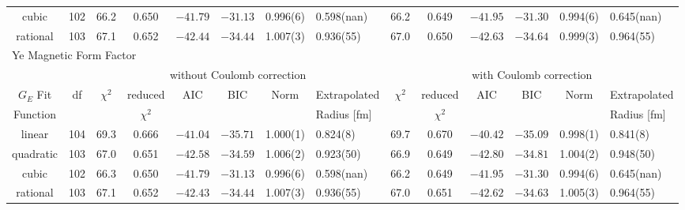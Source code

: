 \documentclass[10pt,superscriptaddress,aps,prc,twocolumn]{revtex4-1}
\begin{document}
\begin{table}
\begin{tabular}{cc|cccccl|cccccl}
cubic     & 102 &  66.2    & 0.650     &$-41.79$&$-31.13$& 0.996(6)  & 0.598(nan)&  66.2    & 0.649     &$-41.95$&$-31.30$& 0.994(6)  & 0.645(nan)    \\ 
rational  & 103 &  67.1    & 0.652     &$-42.44$&$-34.44$& 1.007(3)  & 0.936(55) &  67.0    & 0.650     &$-42.63$&$-34.64$& 0.999(3)  & 0.964(55)    \\ \hline \hline
\multicolumn{14}{l}{Ye Magnetic Form Factor}                                      \\ \hline
          &     & \multicolumn{6}{c}{without Coulomb correction}                 & \multicolumn{6}{|c}{with Coulomb correction} \\
$G_E$ Fit & df  & $\chi^2$ & reduced   & AIC    & BIC    & Norm      & Extrapolated & $\chi^2$ & reduced   & AIC    & BIC    & Norm      & Extrapolated      \\  
Function  &     &          &$\chi^2$   &        &        &           & Radius [fm]      &          & $\chi^2$  &        &        &       & Radius [fm]     \\ \hline
linear    & 104 &  69.3    & 0.666     &$-41.04$&$-35.71$& 1.000(1)  & 0.824(8)  &  69.7    & 0.670     &$-40.42$&$-35.09$& 0.998(1)  & 0.841(8)    \\
quadratic & 103 &  67.0    & 0.651     &$-42.58$&$-34.59$& 1.006(2)  & 0.923(50) &  66.9    & 0.649     &$-42.80$&$-34.81$& 1.004(2)  & 0.948(50)    \\
cubic     & 102 &  66.3    & 0.650     &$-41.79$&$-31.13$& 0.996(6)  & 0.598(nan)&  66.2    & 0.649     &$-41.95$&$-31.30$& 0.994(6)  & 0.645(nan)    \\ 
rational  & 103 &  67.1    & 0.652     &$-42.43$&$-34.44$& 1.007(3)  & 0.936(55) &  67.0    & 0.651     &$-42.62$&$-34.63$& 1.005(3)  & 0.964(55)    \\ \hline \hline
\end{tabular}
\label{lowestdatatable}
\end{table}
\end{document}
